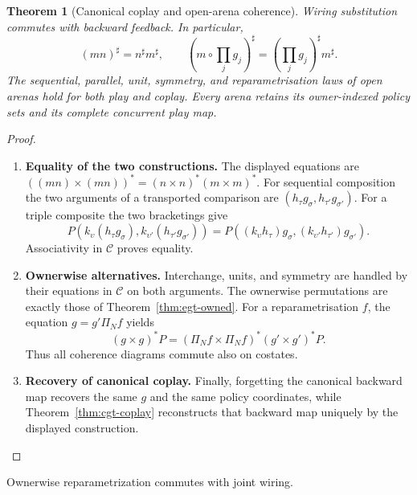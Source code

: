 \documentclass[11pt,a4paper]{article}
\numberwithin{equation}{section}
\newtheorem{theorem}{Theorem}[section]
\theoremstyle{definition}
\theoremstyle{remark}
\theoremstyle{plain}
\begin{document}
\begin{theorem}[Canonical coplay and open-arena coherence]
\label{thm:cgt-wiring-soundness}
Wiring substitution commutes with backward feedback. In particular,
\[
 (mn)^\sharp=n^\sharp m^\sharp,
 \qquad
 (m\circ\textstyle\prod_jg_j)^\sharp
   =(\textstyle\prod_jg_j)^\sharp m^\sharp.
\]
The sequential, parallel, unit, symmetry, and reparametrisation laws
of open arenas hold for both play and coplay. Every arena retains its
owner-indexed policy sets and its complete concurrent play map.
\end{theorem}
\begin{proof}
\leavevmode
\begin{enumerate}[label=\textup{(\arabic*)},leftmargin=*,itemsep=4pt,topsep=3pt]
  \item \textbf{Equality of the two constructions.} The displayed equations are
$((mn)\times(mn))^*=(n\times n)^*(m\times m)^*$. For sequential composition the two arguments of a transported comparison
are $(h_\tau g_\sigma,h_{\tau'}g_{\sigma'})$. For a triple composite the two bracketings give
\[
 P(k_\upsilon(h_\tau g_\sigma),
     k_{\upsilon'}(h_{\tau'}g_{\sigma'}))
 =P((k_\upsilon h_\tau)g_\sigma,
     (k_{\upsilon'}h_{\tau'})g_{\sigma'}).
\]
Associativity in $\mathcal C$ proves equality.
  \item \textbf{Ownerwise alternatives.} Interchange, units, and
symmetry are handled by their equations in $\mathcal C$ on both arguments. The ownerwise permutations are exactly those of
Theorem~\ref{thm:egt-owned}. For a reparametrisation $f$, the equation
$g=g'\Pi_Nf$ yields
\[
 (g\times g)^*P
  =(\Pi_Nf\times\Pi_Nf)^*(g'\times g')^*P.
\]
Thus all coherence diagrams commute also on costates.
  \item \textbf{Recovery of canonical coplay.} Finally, forgetting
the canonical backward map recovers the same $g$ and the same policy
coordinates, while Theorem~\ref{thm:cgt-coplay} reconstructs that backward
map uniquely by the displayed construction.
\end{enumerate}
\end{proof}

\noindent Ownerwise reparametrization commutes with joint wiring.
\begin{center}
\end{center}
\end{document}
